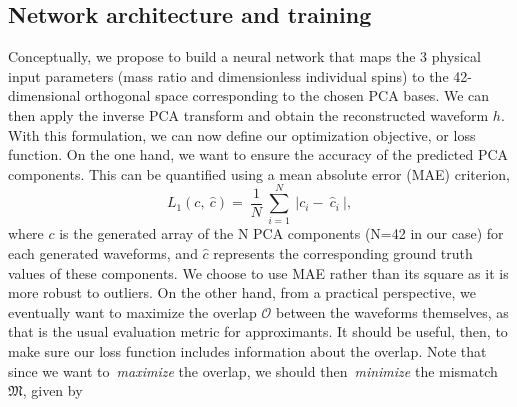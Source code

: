 \documentclass[%
 reprint,
superscriptaddress,
nofootinbib,
 amsmath,amssymb,
 aps,
prd,
floatfix,
]{revtex4-2}
\begin{document}
\subsection{Network architecture and training}
Conceptually, we propose to build a neural network that maps the 3 physical input parameters (mass ratio and dimensionless individual spins) to the 42-dimensional orthogonal space corresponding to the chosen PCA bases. We can then apply the inverse PCA transform and obtain the reconstructed waveform $h$. With this formulation, we can now define our optimization objective, or loss function. On the one hand, we want to ensure the accuracy of the predicted PCA components. This can be quantified using a mean absolute error (MAE) criterion,
\begin{equation} 
L_1(c,~\hat{c}) =~\frac{1}{N}~\sum_{i=1}^{N}~\left| c_i -~\hat{c}_i~\right|, 
\label{eq} 
\end{equation}
where $c$ is the generated array of the N PCA components (N=42 in our case) for each generated waveforms, and $\hat{c}$ represents the corresponding ground truth values of these components. We choose to use MAE rather than its square as it is more robust to outliers.
On the other hand, from a practical perspective, we eventually want to maximize the overlap $\mathcal{O}$ between the waveforms themselves, as that is the usual evaluation metric for approximants. It should be useful, then, to make sure our loss function includes information about the overlap. Note that since we want to~\textit{maximize} the overlap, we should then~\textit{minimize} the mismatch $\mathfrak{M}$, given by 
\end{document}
